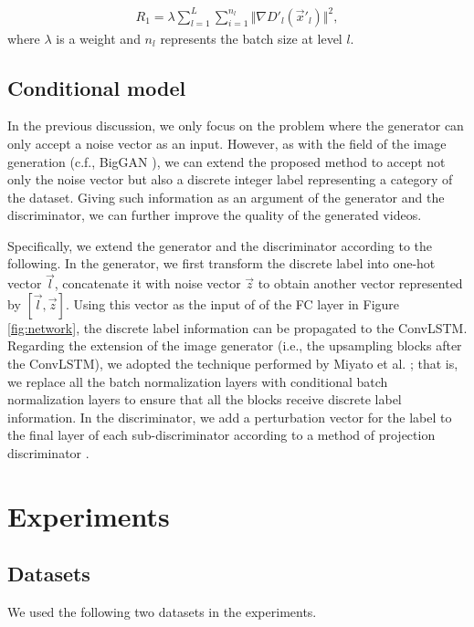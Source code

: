 \documentclass[twocolumn]{svjour3}
\def\Fig#1{Figure \ref{fig:#1}}
\begin{document}
\begin{align}
\label{eqn:gradient_penalty}
    R_1 = \lambda \sum_{l=1}^L \sum_{i=1}^{n_l} \Vert \nabla D'_l (\vec{x}'_l) \Vert^2,
\end{align}
where $\lambda$ is a weight and $n_l$ represents the batch size at level $l$.



\subsection{Conditional model}
\label{sec:cgan}

In the previous discussion, we only focus on the problem
where the generator can only accept a noise vector as an input.
However, as with the field of the image generation (c.f., BigGAN \cite{Brock2018}),
we can extend the proposed method to accept not only the noise vector but also a discrete integer label
representing a category of the dataset.
Giving such information as an argument of the generator and the discriminator,
we can further improve the quality of the generated videos.

Specifically, we extend the generator and the discriminator according to the following.
In the generator, we first transform the discrete label into one-hot vector $\vec{l}$,
concatenate it with noise vector $\vec{z}$ to obtain another vector represented by $[\vec{l}, \vec{z}]$.
Using this vector as the input of of the FC layer in \Fig{network},
the discrete label information can be propagated to the ConvLSTM.
Regarding the extension of the image generator (i.e., the upsampling blocks after the ConvLSTM),
we adopted the technique performed by Miyato et al. \cite{Miyato2018}; that is, we replace
all the batch normalization layers with conditional batch normalization layers to ensure that
all the blocks receive discrete label information.
In the discriminator, we add a perturbation vector for the label to the final layer of each sub-discriminator
according to a method of projection discriminator \cite{Miyato2018a}.

\section{Experiments}
\label{sec:experiments}

\subsection{Datasets}
We used the following two datasets in the experiments.
\end{document}
